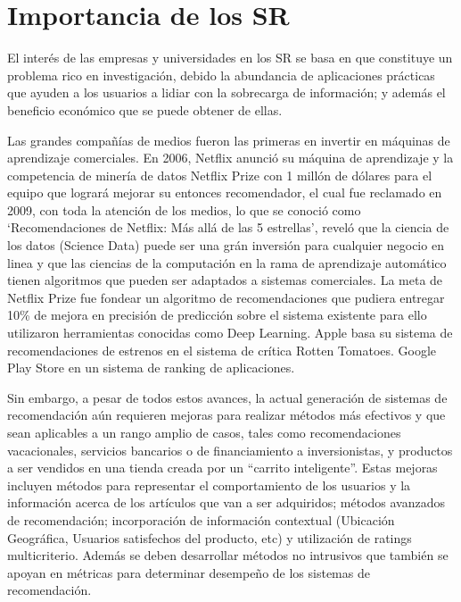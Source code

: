 \section{Importancia de los SR}

El interés  de las empresas y universidades en los SR se basa en que constituye un
problema rico en investigación,  debido la abundancia de aplicaciones
prácticas que ayuden a los usuarios a lidiar con la sobrecarga de
información; y además el beneficio económico que se puede obtener de ellas.

Las grandes compañías de medios fueron las primeras en invertir en
máquinas de aprendizaje comerciales. En 2006, Netflix anunció su máquina
de aprendizaje y la competencia de minería de datos Netflix Prize con 1 millón de
dólares para el equipo que logrará mejorar su entonces recomendador, el cual fue reclamado en 2009, con toda la atención de
los medios, lo que se conoció como `Recomendaciones de Netflix: Más allá
de las 5 estrellas', reveló  que la ciencia de los datos (Science Data) puede ser una grán inversión para cualquier negocio en linea y que las ciencias de la computación en la rama de aprendizaje automático tienen algoritmos que pueden ser adaptados a sistemas comerciales. La meta de Netflix Prize
fue fondear un algoritmo de recomendaciones que pudiera entregar 10\% de
mejora en precisión de predicción sobre el sistema existente para ello utilizaron herramientas conocidas como Deep Learning. Apple basa
su sistema de recomendaciones de estrenos en el sistema de crítica
Rotten Tomatoes. Google Play Store en un sistema de ranking de
aplicaciones.

Sin embargo, a pesar de todos estos avances, la actual generación de
sistemas de recomendación aún requieren mejoras para realizar métodos
más efectivos y que sean aplicables a un rango amplio de casos, tales como
recomendaciones vacacionales, servicios bancarios o de
financiamiento a inversionistas, y productos a ser vendidos en una
tienda creada por un ``carrito inteligente''. 
Estas mejoras
incluyen  métodos para representar el comportamiento  de los usuarios y la
información acerca de los artículos que van a ser adquiridos; métodos avanzados
de recomendación; incorporación de información contextual (Ubicación Geográfica, Usuarios satisfechos del producto, etc) y utilización
de ratings multicriterio. Además se deben desarrollar métodos no
intrusivos que también se apoyan en métricas para determinar desempeño
de los sistemas de recomendación.
